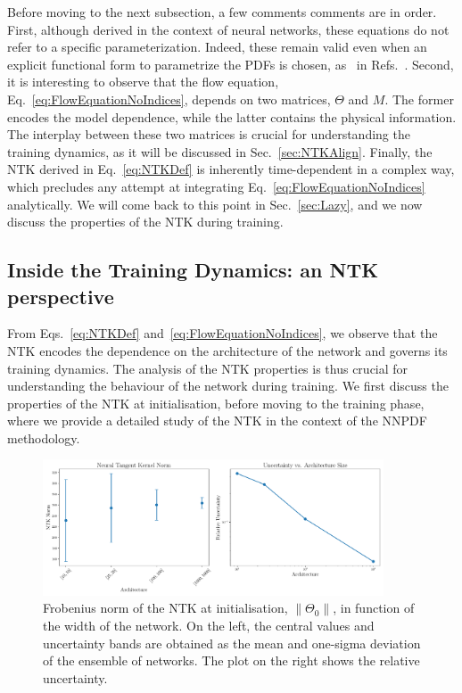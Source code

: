 Before moving to the next subsection, a few comments comments are in order.
First, although derived in the context of neural networks, these equations do
not refer to a specific parameterization. Indeed, these remain valid even when
an explicit functional form to parametrize the PDFs is chosen, as \eg~in
Refs.~\cite{Bailey:2020ooq,Hou:2019efy,Costantini:2025wxp}. Second, it is
interesting to observe that the flow equation,
Eq.~\eqref{eq:FlowEquationNoIndices}, depends on two matrices, $\Theta$ and $M$.
The former encodes the model dependence, while the latter contains the physical
information. The interplay between these two matrices is crucial for
understanding the training dynamics, as it will be discussed in
Sec.~\ref{sec:NTKAlign}. Finally, the NTK derived in Eq.~\ref{eq:NTKDef} is
inherently time-dependent in a complex way, which precludes any attempt at
integrating Eq.~\ref{eq:FlowEquationNoIndices} analytically. We will come back
to this point in Sec.~\ref{sec:Lazy}, and we now discuss the properties of the
NTK during training.

\subsection{Inside the Training Dynamics: an NTK perspective}

From Eqs.~\eqref{eq:NTKDef} and~\eqref{eq:FlowEquationNoIndices}, we observe
that the NTK encodes the dependence on the architecture of the network and
governs its training dynamics. The analysis of the NTK properties is thus
crucial for understanding the behaviour of the network during training. We first
discuss the properties of the NTK at initialisation, before moving to the
training phase, where we provide a detailed study of the NTK in the context of
the NNPDF methodology.

\begin{figure}[t!]
  \centering
  \includegraphics[width=0.90\textwidth]{figs/section_3/ntk_initialization_with_uncertainty.pdf}
  \caption{Frobenius norm of the NTK at initialisation, $\lVert \Theta_0
  \rVert$, in function of the width of the network. On the left, the central
  values and uncertainty bands are obtained as the mean and one-sigma deviation
  of the ensemble of networks. The plot on the right shows the relative
  uncertainty.}
  \label{fig:NTKInit}
\end{figure}

